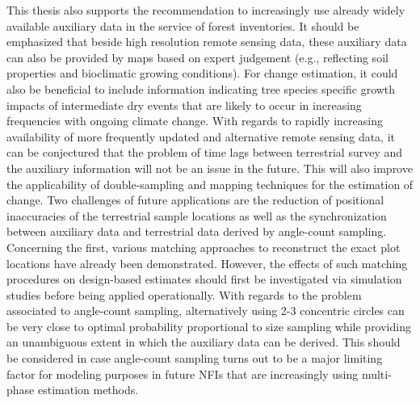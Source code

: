 This thesis also supports the recommendation to increasingly use already widely available auxiliary data in the service of forest inventories. It should be emphasized that beside high resolution remote sensing data, these auxiliary data can also be provided by maps based on expert judgement (e.g., reflecting soil properties and bioclimatic growing conditions). For change estimation, it could also be beneficial to include information indicating tree species specific growth impacts of intermediate dry events that are likely to occur in increasing frequencies with ongoing climate change. With regards to rapidly increasing availability of more frequently updated and alternative remote sensing data, it can be conjectured that the problem of time lags between terrestrial survey and the auxiliary information will not be an issue in the future. This will also improve the applicability of double-sampling and mapping techniques for the estimation of change. Two challenges of future applications are the reduction of positional inaccuracies of the terrestrial sample locations as well as the synchronization between auxiliary data and terrestrial data derived by angle-count sampling. Concerning the first, various matching approaches to reconstruct the exact plot locations have already been demonstrated. However, the effects of such matching procedures on design-based estimates should first be investigated via simulation studies before being applied operationally. With regards to the problem associated to angle-count sampling, alternatively using 2-3 concentric circles can be very close to optimal probability proportional to size sampling \citep{mandallaz2008} while providing an unambiguous extent in which the auxiliary data can be derived. This should be considered in case angle-count sampling turns out to be a major limiting factor for modeling purposes in future NFIs that are increasingly using multi-phase estimation methods.\par
 
